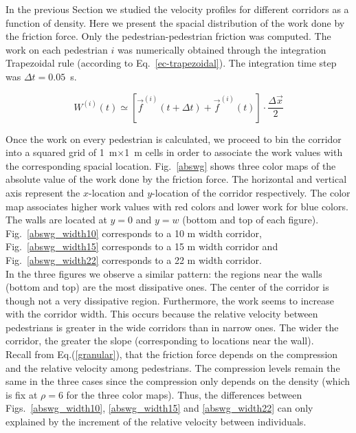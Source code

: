 \documentclass[preprint,12pt]{elsarticle}
\begin{document}
In the previous Section we studied the velocity profiles for different corridors as a function of density. Here we present the spacial distribution of the work done by the friction force. Only the pedestrian-pedestrian friction was computed.
The work on each pedestrian $i$ was numerically obtained through the integration Trapezoidal rule (according to Eq.~\ref{ec-trapezoidal}). The integration time step was $\Delta t = 0.05$~s. 

\begin{equation}
W^{(i)}(t) \simeq \left [ \vec{f}^{(i)}(t+\Delta t) + \vec{f}^{(i)}(t)  \right ]\cdot \frac{\Delta \vec{x}}{2} \label{ec-trapezoidal}
\end{equation}

Once the work on every pedestrian is calculated, we proceed to bin the corridor into a squared grid of 1~m$\times$1~m cells in order to associate the work values with the corresponding spacial location. Fig.~\ref{abswg} shows three color maps of the absolute value of the work done by the friction force. The horizontal and vertical axis represent the $x$-location and $y$-location of the corridor respectively. The color map associates higher work values with red colors and lower work for blue colors. The walls are located at $y=0$ and $y=w$ (bottom and top of each figure). Fig.~\ref{abswg_width10} corresponds to a 10 m width corridor, Fig.~\ref{abswg_width15} corresponds to a 15 m width corridor and Fig.~\ref{abswg_width22} corresponds to a 22 m width corridor.\\

In the three figures we observe a similar pattern: the regions near the walls (bottom and top) are the most dissipative ones. The center of the corridor is though not a very dissipative region. Furthermore, the work seems to increase with the corridor width. This occurs because the relative velocity between pedestrians is greater in the wide corridors than in narrow ones. The wider the corridor, the greater the slope (corresponding to locations near the wall).\\

Recall from Eq.(\ref{granular}), that the friction force depends on the compression and the relative velocity among pedestrians. The compression levels remain the same in the three cases since the compression only depends on the density (which is fix at $\rho=6$ for the three color maps). Thus, the differences between Figs.~\ref{abswg_width10}, \ref{abswg_width15} and \ref{abswg_width22} can only explained by the increment of the relative velocity between individuals. \\
\end{document}
